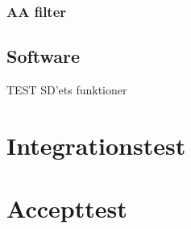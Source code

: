 \subsection{AA filter}
\section{Software}
TEST SD'ets funktioner
\chapter{Integrationstest}


\chapter{Accepttest}






\citep{Aroom2009}


